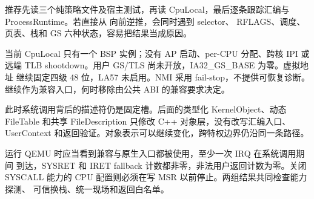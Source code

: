 推荐先读三个纯策略文件及宿主测试，再读 CpuLocal，最后逐条跟踪汇编与
ProcessRuntime。若直接从  向前逆推，会同时遇到 selector、
RFLAGS、调度、页表、栈和 GS 六种状态，容易把结果当成原因。

当前 CpuLocal 只有一个 BSP 实例；没有 AP 启动、per-CPU 分配、跨核 IPI 或
远端 TLB shootdown。用户 GS/TLS 尚未开放，IA32\_GS\_BASE 为零。虚拟地址
继续固定四级 48 位，LA57 未启用。NMI 采用 fail-stop，不提供可恢复诊断。
 继续作为兼容入口，何时移除由公共 ABI 的兼容要求决定。

此时系统调用背后的描述符仍是固定槽。后面的类型化 KernelObject、动态
FileTable 和共享 FileDescription 只修改 C++ 对象层，没有改写汇编入口、
UserContext 和返回验证。对象表示可以继续变化，跨特权边界仍沿同一条路径。

运行 QEMU 时应当看到兼容与原生入口都被使用，至少一次 IRQ 在系统调用期间
到达，SYSRET 和 IRET fallback 计数都非零，非法用户返回计数为零。关闭
SYSCALL 能力的 CPU 配置则必须在写 MSR 以前停止。两组结果共同检查能力探测、
可信换栈、统一现场和返回白名单。
